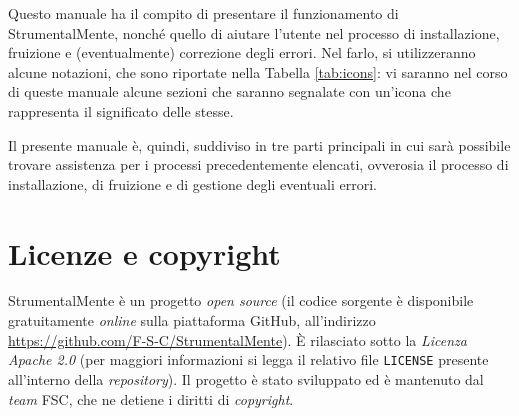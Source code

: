 Questo manuale ha il compito di presentare il funzionamento di StrumentalMente,
nonché quello di aiutare l'utente nel processo di installazione, fruizione e
(eventualmente) correzione degli errori. Nel farlo, si utilizzeranno alcune
notazioni, che sono riportate nella Tabella \ref{tab:icons}: vi saranno nel
corso di queste manuale alcune sezioni che saranno segnalate con un'icona che
rappresenta il significato delle stesse.

Il presente manuale è, quindi, suddiviso in tre parti principali in cui sarà
possibile trovare assistenza per i processi precedentemente elencati, ovverosia
il processo di installazione, di fruizione e di gestione degli eventuali errori.

\section{Licenze e copyright}

StrumentalMente è un progetto \emph{open source} (il codice sorgente è
disponibile gratuitamente \emph{online} sulla piattaforma GitHub, all'indirizzo
\url{https://github.com/F-S-C/StrumentalMente}). È rilasciato sotto la
\emph{Licenza Apache 2.0} (per maggiori informazioni si legga il relativo file
\texttt{LICENSE} presente all'interno della \emph{repository}). Il progetto è
stato sviluppato ed è mantenuto dal \emph{team} FSC, che ne detiene i diritti di
\emph{copyright}.